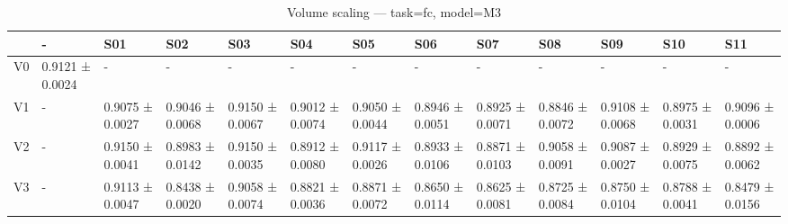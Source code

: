 \begin{table}[htbp]
\centering
\caption{Volume scaling — task=fc, model=M3}
\label{tab:volume:fc:M3}
\begin{tabular}{lllllllllllll}
\toprule
\toprule
 & - & S01 & S02 & S03 & S04 & S05 & S06 & S07 & S08 & S09 & S10 & S11 \\
\midrule
\midrule
V0 & 0.9121 ± 0.0024 & - & - & - & - & - & - & - & - & - & - & - \\
V1 & - & 0.9075 ± 0.0027 & 0.9046 ± 0.0068 & 0.9150 ± 0.0067 & 0.9012 ± 0.0074 & 0.9050 ± 0.0044 & 0.8946 ± 0.0051 & 0.8925 ± 0.0071 & 0.8846 ± 0.0072 & 0.9108 ± 0.0068 & 0.8975 ± 0.0031 & 0.9096 ± 0.0006 \\
V2 & - & 0.9150 ± 0.0041 & 0.8983 ± 0.0142 & 0.9150 ± 0.0035 & 0.8912 ± 0.0080 & 0.9117 ± 0.0026 & 0.8933 ± 0.0106 & 0.8871 ± 0.0103 & 0.9058 ± 0.0091 & 0.9087 ± 0.0027 & 0.8929 ± 0.0075 & 0.8892 ± 0.0062 \\
V3 & - & 0.9113 ± 0.0047 & 0.8438 ± 0.0020 & 0.9058 ± 0.0074 & 0.8821 ± 0.0036 & 0.8871 ± 0.0072 & 0.8650 ± 0.0114 & 0.8625 ± 0.0081 & 0.8725 ± 0.0084 & 0.8750 ± 0.0104 & 0.8788 ± 0.0041 & 0.8479 ± 0.0156 \\
\bottomrule
\end{tabular}\end{table}
